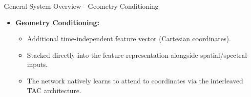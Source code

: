 \documentclass[8pt,hyperref={pdfpagelabels=true},xcolor=table,aspectratio=169]{beamer}
\begin{document}
\begin{frame}{General System Overview - Geometry Conditioning}
\begin{center}
    \end{center}
    \vspace{0.5em}
    \begin{itemize}
        \item \textbf{Geometry Conditioning:} 
        \begin{itemize}
            \item Additional time-independent feature vector (Cartesian coordinates).
            \item Stacked directly into the feature representation alongside spatial/spectral inputs.
            \item The network natively learns to attend to coordinates via the interleaved TAC architecture.
        \end{itemize}
    \end{itemize}
\end{frame}
\end{document}
